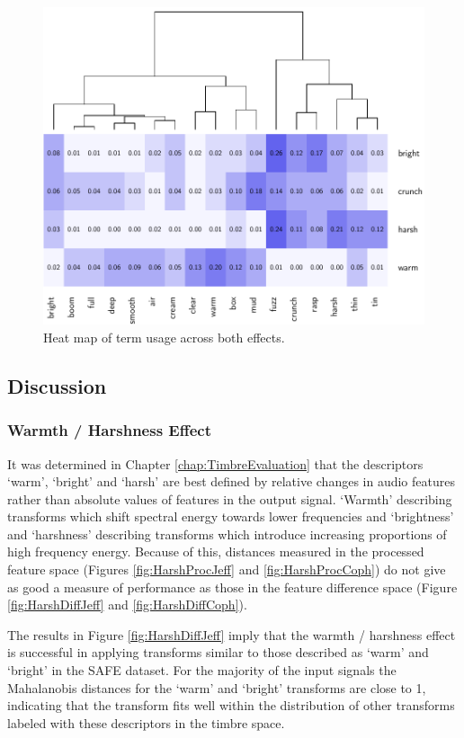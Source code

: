 			\begin{figure}[h!]
				\centering
				\includegraphics{chapter7/Images/CombinedConfusion.pdf}
				\caption{Heat map of term usage across both effects.}
				\label{fig:CombConfusion}
			\end{figure}

	\subsection{Discussion}
	\label{sec:PerceptualExperiments-SemanticControl-Discussion}
		\subsubsection*{Warmth / Harshness Effect}
			It was determined in Chapter \ref{chap:TimbreEvaluation} that the descriptors `warm', `bright' and
			`harsh' are best defined by relative changes in audio features rather than absolute values of
			features in the output signal. `Warmth' describing transforms which shift spectral energy towards
			lower frequencies and `brightness' and `harshness' describing transforms which introduce increasing
			proportions of high frequency energy. Because of this, distances measured in the processed feature
			space (Figures \ref{fig:HarshProcJeff} and \ref{fig:HarshProcCoph}) do not give as good a measure
			of performance as those in the feature difference space (Figure \ref{fig:HarshDiffJeff} and
			\ref{fig:HarshDiffCoph}).

			The results in Figure \ref{fig:HarshDiffJeff} imply that the warmth / harshness effect is
			successful in applying transforms similar to those described as `warm' and `bright' in the SAFE
			dataset. For the majority of the input signals the Mahalanobis distances for the `warm' and
			`bright' transforms are close to 1, indicating that the transform fits well within the distribution
			of other transforms labeled with these descriptors in the timbre space.
			
